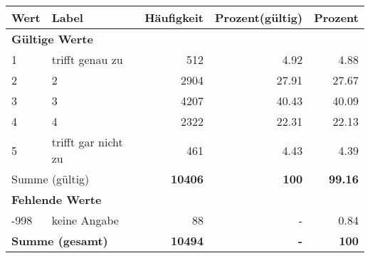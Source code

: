      \begin{longtable}{lXrrr}
     \toprule
     \textbf{Wert} & \textbf{Label} & \textbf{Häufigkeit} & \textbf{Prozent(gültig)} & \textbf{Prozent} \\
     \endhead
     \midrule
     \multicolumn{5}{l}{\textbf{Gültige Werte}}\\

     1 &
     \multicolumn{1}{X}{ trifft genau zu   } &


       \num{512} &
       \num[round-mode=places,round-precision=2]{4,92} &
         \num[round-mode=places,round-precision=2]{4,88} \\

     2 &
     \multicolumn{1}{X}{ 2   } &


       \num{2904} &
       \num[round-mode=places,round-precision=2]{27,91} &
         \num[round-mode=places,round-precision=2]{27,67} \\

     3 &
     \multicolumn{1}{X}{ 3   } &


       \num{4207} &
       \num[round-mode=places,round-precision=2]{40,43} &
         \num[round-mode=places,round-precision=2]{40,09} \\

     4 &
     \multicolumn{1}{X}{ 4   } &


       \num{2322} &
       \num[round-mode=places,round-precision=2]{22,31} &
         \num[round-mode=places,round-precision=2]{22,13} \\

     5 &
     \multicolumn{1}{X}{ trifft gar nicht zu   } &


       \num{461} &
       \num[round-mode=places,round-precision=2]{4,43} &
         \num[round-mode=places,round-precision=2]{4,39} \\
     \midrule
     \multicolumn{2}{l}{Summe (gültig)} &
       \textbf{\num{10406}} &
     \textbf{100} &
       \textbf{\num[round-mode=places,round-precision=2]{99,16}} \\
     \multicolumn{5}{l}{\textbf{Fehlende Werte}}\\
       -998 &
       keine Angabe &
         \num{88} &
        - &
         \num[round-mode=places,round-precision=2]{0,84} \\
     \midrule
     \multicolumn{2}{l}{\textbf{Summe (gesamt)}} &
          \textbf{\num{10494}} &
        \textbf{-} &
        \textbf{100} \\
     \bottomrule
     \end{longtable}
     
